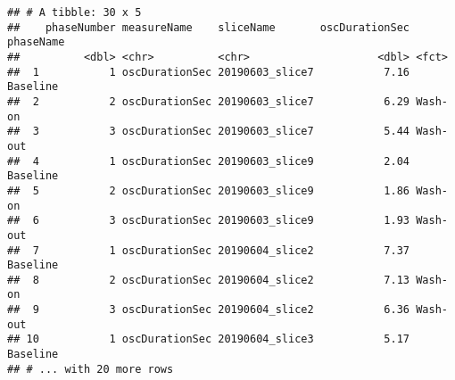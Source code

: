 \documentclass[]{article}
\newenvironment{Shaded}{\begin{snugshade}}{\end{snugshade}}
\newcommand{\CommentTok}[1]{\textcolor[rgb]{0.56,0.35,0.01}{\textit{#1}}}
\newcommand{\DataTypeTok}[1]{\textcolor[rgb]{0.13,0.29,0.53}{#1}}
\newcommand{\DecValTok}[1]{\textcolor[rgb]{0.00,0.00,0.81}{#1}}
\newcommand{\KeywordTok}[1]{\textcolor[rgb]{0.13,0.29,0.53}{\textbf{#1}}}
\newcommand{\NormalTok}[1]{#1}
\newcommand{\OperatorTok}[1]{\textcolor[rgb]{0.81,0.36,0.00}{\textbf{#1}}}
\newcommand{\StringTok}[1]{\textcolor[rgb]{0.31,0.60,0.02}{#1}}
\begin{document}
\begin{Shaded}
\end{Shaded}

\begin{verbatim}
## # A tibble: 30 x 5
##    phaseNumber measureName    sliceName       oscDurationSec phaseName
##          <dbl> <chr>          <chr>                    <dbl> <fct>    
##  1           1 oscDurationSec 20190603_slice7           7.16 Baseline 
##  2           2 oscDurationSec 20190603_slice7           6.29 Wash-on  
##  3           3 oscDurationSec 20190603_slice7           5.44 Wash-out 
##  4           1 oscDurationSec 20190603_slice9           2.04 Baseline 
##  5           2 oscDurationSec 20190603_slice9           1.86 Wash-on  
##  6           3 oscDurationSec 20190603_slice9           1.93 Wash-out 
##  7           1 oscDurationSec 20190604_slice2           7.37 Baseline 
##  8           2 oscDurationSec 20190604_slice2           7.13 Wash-on  
##  9           3 oscDurationSec 20190604_slice2           6.36 Wash-out 
## 10           1 oscDurationSec 20190604_slice3           5.17 Baseline 
## # ... with 20 more rows
\end{verbatim}
\end{document}
